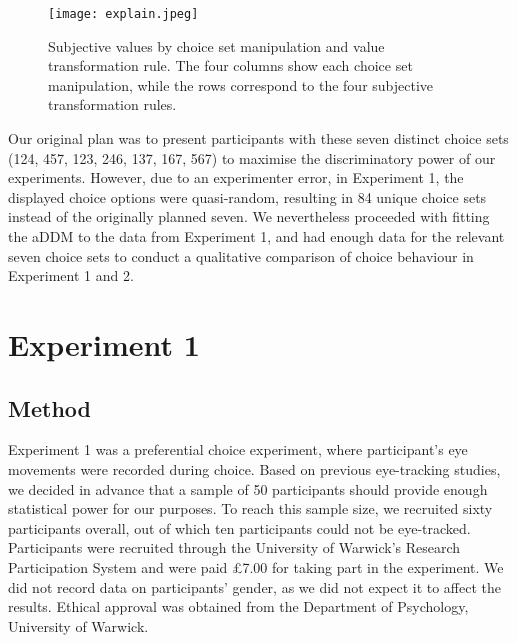 \documentclass[11pt,a4paper]{article}
\begin{document}
\begin{figure}
\captionsetup{justification=centering}
\centering
\caption{Subjective values by choice set manipulation and value transformation rule. The four columns show each choice set manipulation, while the rows correspond to the four subjective transformation rules.}
\texttt{[image: explain.jpeg]}
\label{fig:choicesetmanip}
\end{figure}

Our original plan was to present participants with these seven distinct choice sets (124, 457, 123, 246, 137, 167, 567) to maximise the discriminatory power of our experiments. However, due to an experimenter error, in Experiment 1, the displayed choice options were quasi-random, resulting in 84 unique choice sets instead of the originally planned seven. We nevertheless proceeded with fitting the aDDM to the data from Experiment 1, and had enough data for the relevant seven choice sets to conduct a qualitative comparison of choice behaviour in Experiment 1 and 2.


\section{Experiment 1}

\subsection{Method} \label{chap1exp1method}

Experiment 1 was a preferential choice experiment, where participant's eye movements were recorded during choice. Based on previous eye-tracking studies, we decided in advance that a sample of 50 participants should provide enough statistical power for our purposes. To reach this sample size, we recruited sixty participants overall, out of which ten participants could not be eye-tracked. Participants were recruited through the University of Warwick's Research Participation System and were paid £7.00 for taking part in the experiment. We did not record data on participants' gender, as we did not expect it to affect the results. Ethical approval was obtained from the Department of Psychology, University of Warwick.
\end{document}
